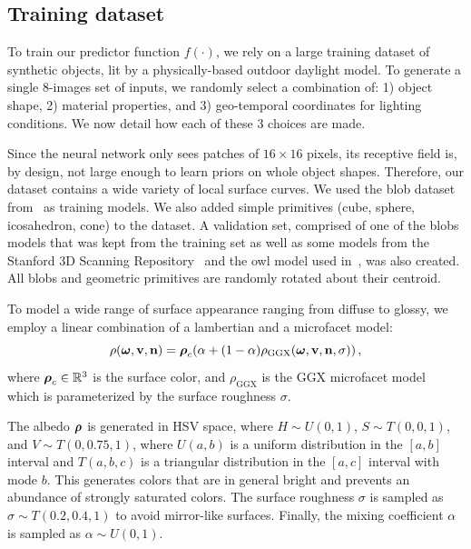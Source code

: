 \subsection{Training dataset}
\label{sec:training_dataset}

To train our predictor function $f(\cdot)$, we rely on a large training dataset of synthetic objects, lit by a physically-based outdoor daylight model. To generate a single 8-images set of inputs, we randomly select a combination of: 1) object shape, 2) material properties, and 3) geo-temporal coordinates for lighting conditions. We now detail how each of these 3 choices are made. 

Since the neural network only sees patches of $16 \times 16$ pixels, its receptive field is, by design, not large enough to learn priors on whole object shapes. Therefore, our dataset contains a wide variety of local surface curves. We used the blob dataset from~\cite{johnson-cvpr-11} as training models. We also added simple  primitives (cube, sphere, icosahedron, cone) to the dataset. A validation set, comprised of one of the blobs models that was kept from the training set as well as some models from the Stanford 3D Scanning Repository~\cite{curless-cg-96} and the owl model used in~\cite{holdgeoffroy-iccp-15}, was also created. All blobs and geometric primitives are randomly rotated about their centroid. 


To model a wide range of surface appearance ranging from diffuse to glossy, we employ a linear combination of a lambertian and a microfacet model: 
%
\begin{equation}
\rho(\boldsymbol \omega, {\bf v}, {\bf n}) = \boldsymbol \rho_c (\alpha + (1-\alpha)\rho_\text{GGX}(\boldsymbol \omega, {\bf v}, {\bf n}, \sigma)) \,,
\label{eq:brdf}
\end{equation}
%
where $\boldsymbol \rho_c \in \mathbb{R}^3$ is the surface color, and $\rho_\text{GGX}$ is the GGX microfacet model~\cite{walter-eg-07} which is parameterized by the surface roughness $\sigma$. 

The albedo $\boldsymbol \rho$ is generated in HSV space, where $H \sim U(0,1)$, $S \sim T(0, 0, 1)$, and $V \sim T(0, 0.75, 1)$, where $U(a, b)$ is a uniform distribution in the $[a, b]$ interval and $T(a,b,c)$ is a triangular distribution in the $[a,c]$ interval with mode $b$. This generates colors that are in general bright and prevents an abundance of strongly saturated colors. The surface roughness $\sigma$ is sampled as $\sigma \sim T(0.2, 0.4, 1)$ to avoid mirror-like surfaces. Finally, the mixing coefficient $\alpha$ is sampled as $\alpha \sim U(0,1)$. 

